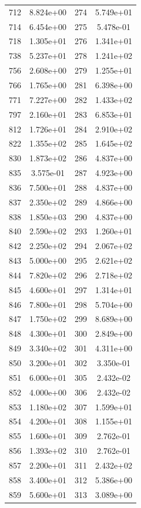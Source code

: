 \documentclass[12pt]{article}
\begin{document}
\begin{longtable}{@{}cccc@{}}
712 & 8.824e+00 & 274 & 5.749e+01 \\
714 & 6.454e+00 & 275 & 5.478e-01 \\
718 & 1.305e+01 & 276 & 1.341e+01 \\
738 & 5.237e+01 & 278 & 1.241e+02 \\
756 & 2.608e+00 & 279 & 1.255e+01 \\
766 & 1.765e+00 & 281 & 6.398e+00 \\
771 & 7.227e+00 & 282 & 1.433e+02 \\
797 & 2.160e+01 & 283 & 6.853e+01 \\
812 & 1.726e+01 & 284 & 2.910e+02 \\
822 & 1.355e+02 & 285 & 1.645e+02 \\
830 & 1.873e+02 & 286 & 4.837e+00 \\
835 & 3.575e-01 & 287 & 4.923e+00 \\
836 & 7.500e+01 & 288 & 4.837e+00 \\
837 & 2.350e+02 & 289 & 4.866e+00 \\
838 & 1.850e+03 & 290 & 4.837e+00 \\
840 & 2.590e+02 & 293 & 1.260e+01 \\
842 & 2.250e+02 & 294 & 2.067e+02 \\
843 & 5.000e+00 & 295 & 2.621e+02 \\
844 & 7.820e+02 & 296 & 2.718e+02 \\
845 & 4.600e+01 & 297 & 1.314e+01 \\
846 & 7.800e+01 & 298 & 5.704e+00 \\
847 & 1.750e+02 & 299 & 8.689e+00 \\
848 & 4.300e+01 & 300 & 2.849e+00 \\
849 & 3.340e+02 & 301 & 4.311e+00 \\
850 & 3.200e+01 & 302 & 3.350e-01 \\
851 & 6.000e+01 & 305 & 2.432e-02 \\
852 & 4.000e+00 & 306 & 2.432e-02 \\
853 & 1.180e+02 & 307 & 1.599e+01 \\
854 & 4.200e+01 & 308 & 1.155e+01 \\
855 & 1.600e+01 & 309 & 2.762e-01 \\
856 & 1.393e+02 & 310 & 2.762e-01 \\
857 & 2.200e+01 & 311 & 2.432e+02 \\
858 & 3.400e+01 & 312 & 5.386e+00 \\
859 & 5.600e+01 & 313 & 3.089e+00 \\

\end{longtable}
\end{document}
